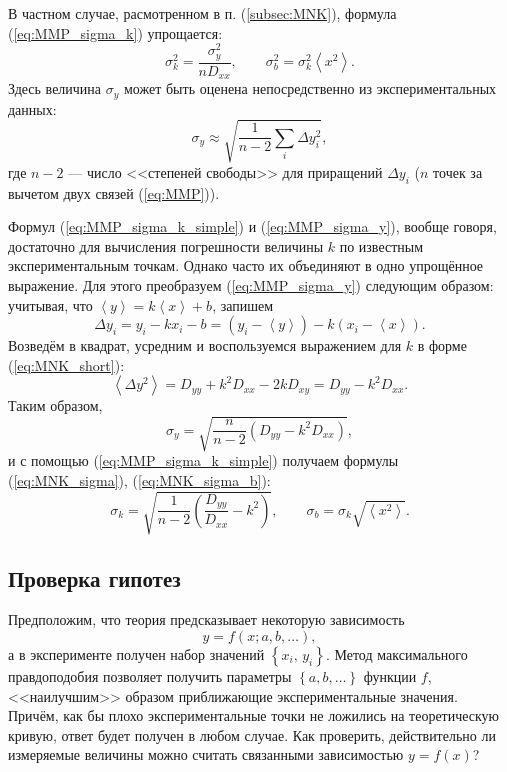 \documentclass[10pt]{article}
\begin{document}
{\small{}В частном случае, расмотренном в п. (\ref{subsec:MNK}),
формула (\ref{eq:MMP_sigma_k}) упрощается:
\begin{equation}
\boxed{\sigma_{k}^{2}=\frac{\sigma_{y}^{2}}{nD_{xx}},\qquad\sigma_{b}^{2}=\sigma_{k}^{2}\left\langle x^{2}\right\rangle }.\label{eq:MMP_sigma_k_simple}
\end{equation}
Здесь величина $\sigma_{y}$ может быть оценена непосредственно из
экспериментальных данных:
\begin{equation}
\sigma_{y}\approx\sqrt{\frac{1}{n-2}\sum_{i}\Delta y_{i}^{2}},\label{eq:MMP_sigma_y}
\end{equation}
где $n-2$ --- число <<степеней свободы>>
для приращений $\Delta y_{i}$ ($n$ точек за вычетом двух связей
(\ref{eq:MMP})).}{\small\par}

{\small{}Формул (\ref{eq:MMP_sigma_k_simple}) и (\ref{eq:MMP_sigma_y}),
вообще говоря, достаточно для вычисления погрешности величины $k$
по известным экспериментальным точкам. Однако часто их объединяют
в одно упрощённое выражение. Для этого преобразуем (\ref{eq:MMP_sigma_y})
следующим образом: учитывая, что $\left\langle y\right\rangle =k\left\langle x\right\rangle +b$,
запишем 
\[
\Delta y_{i}=y_{i}-kx_{i}-b=\left(y_{i}-\left\langle y\right\rangle \right)-k\left(x_{i}-\left\langle x\right\rangle \right).
\]
Возведём в квадрат, усредним и воспользуемся выражением для $k$ в
форме (\ref{eq:MNK_short}):
\[
\left\langle \Delta y^{2}\right\rangle =D_{yy}+k^{2}D_{xx}-2kD_{xy}=D_{yy}-k^{2}D_{xx}.
\]
Таким образом, 
\[
\sigma_{y}=\sqrt{\frac{n}{n-2}\left(D_{yy}-k^{2}D_{xx}\right)},
\]
и с помощью (\ref{eq:MMP_sigma_k_simple}) получаем формулы (\ref{eq:MNK_sigma}),
(\ref{eq:MNK_sigma_b}):
\[
\boxed{\sigma_{k}=\sqrt{\frac{1}{n-2}\left(\frac{D_{yy}}{D_{xx}}-k^{2}\right)},\qquad\sigma_{b}=\sigma_{k}\sqrt{\left\langle x^{2}\right\rangle }}.
\]
}{\small\par}

\subsection{{\small{}Проверка гипотез}}

{\small{}Предположим, что теория предсказывает некоторую зависимость
\[
y=f\!\left(x;a,b,\ldots\right),
\]
а в эксперименте получен набор значений $\left\{ x_{i},\,y_{i}\right\} $.
Метод максимального правдоподобия позволяет получить параметры $\left\{ a,b,\ldots\right\} $
функции $f$, <<наилучшим>> образом приближающие
экспериментальные значения. Причём, как бы плохо экспериментальные
точки не ложились на теоретическую кривую, ответ будет получен в любом
случае. Как проверить, действительно ли измеряемые величины можно
считать связанными зависимостью $y=f\!\left(x\right)$?}{\small\par}
\end{document}

